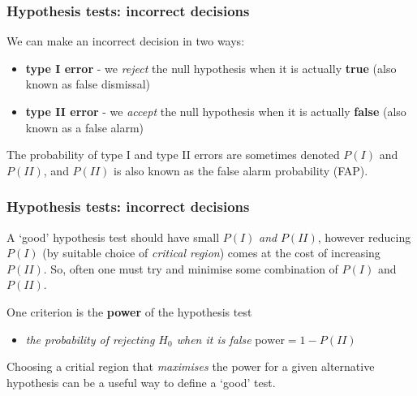 \begin{frame}

\frametitle{Hypothesis tests: incorrect decisions}
\label{hypothesistests:incorrectdecisions}

We can make an incorrect decision in two ways:

\begin{itemize}
\item \textbf{type I error} - we \emph{reject} the null hypothesis when it is actually \textbf{true} (also known as false dismissal)

\item \textbf{type II error} - we \emph{accept} the null hypothesis when it is actually \textbf{false} (also known as a false alarm)

\end{itemize}

The probability of type I and type II errors are sometimes denoted $P(I)$ and $P(II)$,
and $P(II)$ is also known as the false alarm probability (FAP).

\end{frame}

\begin{frame}

\frametitle{Hypothesis tests: incorrect decisions}
\label{hypothesistests:incorrectdecisions}

A `good' hypothesis test should have small $P(I)$ \emph{and} $P(II)$, however reducing $P(I)$ (by suitable choice of
\emph{critical region}) comes at the cost of increasing $P(II)$. So, often one must try and minimise some combination
of $P(I)$ and $P(II)$.

One criterion is the \textbf{power} of the hypothesis test

\begin{itemize}
\item \emph{the probability of rejecting $H_0$ when it is false} $\text{power} = 1-P(II)$

\end{itemize}

Choosing a critial region that \emph{maximises} the power for a given alternative hypothesis can be a useful way to
define a `good' test.

\end{frame}

